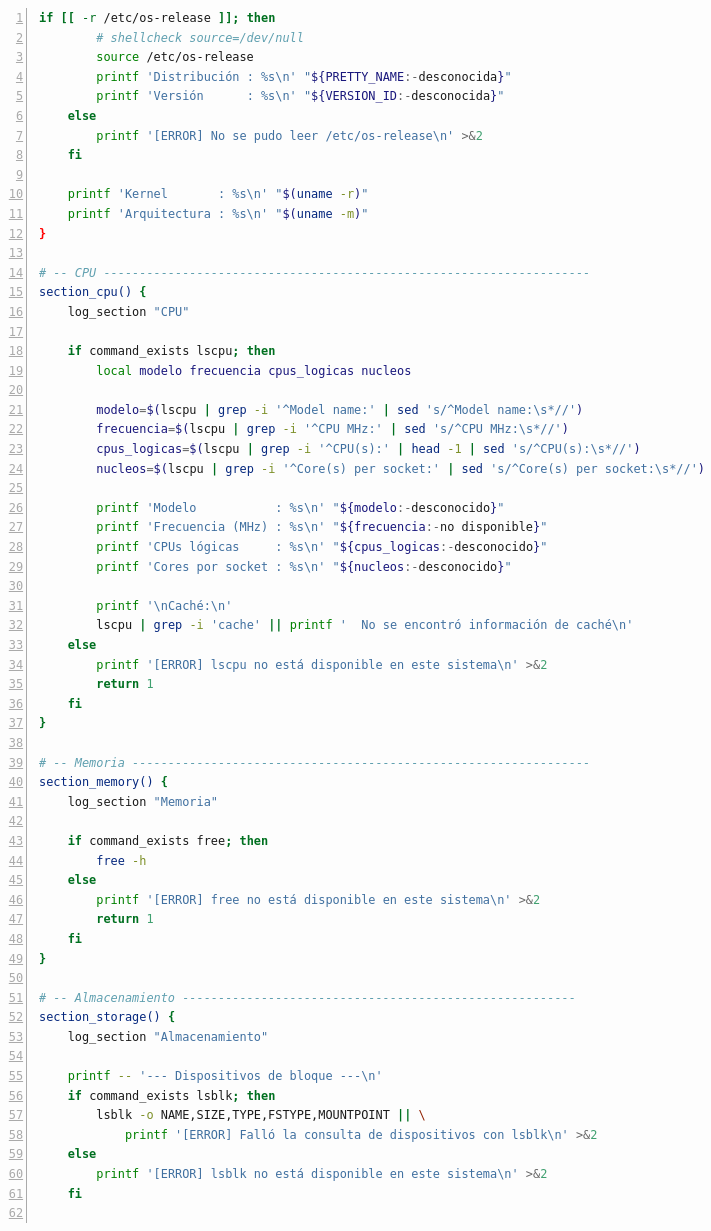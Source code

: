 \documentclass[11pt,a4paper]{article}
\begin{document}
\begin{multicols*}{2}
\begin{lstlisting}[language=bash, basicstyle=\fontsize{5.2pt}{6.0pt}\ttfamily\color{darkslate}, numbers=left, numberstyle=\tiny\color{gray!70}, stepnumber=10, xleftmargin=1.0em]
    if [[ -r /etc/os-release ]]; then
        # shellcheck source=/dev/null
        source /etc/os-release
        printf 'Distribución : %s\n' "${PRETTY_NAME:-desconocida}"
        printf 'Versión      : %s\n' "${VERSION_ID:-desconocida}"
    else
        printf '[ERROR] No se pudo leer /etc/os-release\n' >&2
    fi

    printf 'Kernel       : %s\n' "$(uname -r)"
    printf 'Arquitectura : %s\n' "$(uname -m)"
}

# -- CPU --------------------------------------------------------------------
section_cpu() {
    log_section "CPU"

    if command_exists lscpu; then
        local modelo frecuencia cpus_logicas nucleos

        modelo=$(lscpu | grep -i '^Model name:' | sed 's/^Model name:\s*//')
        frecuencia=$(lscpu | grep -i '^CPU MHz:' | sed 's/^CPU MHz:\s*//')
        cpus_logicas=$(lscpu | grep -i '^CPU(s):' | head -1 | sed 's/^CPU(s):\s*//')
        nucleos=$(lscpu | grep -i '^Core(s) per socket:' | sed 's/^Core(s) per socket:\s*//')

        printf 'Modelo           : %s\n' "${modelo:-desconocido}"
        printf 'Frecuencia (MHz) : %s\n' "${frecuencia:-no disponible}"
        printf 'CPUs lógicas     : %s\n' "${cpus_logicas:-desconocido}"
        printf 'Cores por socket : %s\n' "${nucleos:-desconocido}"

        printf '\nCaché:\n'
        lscpu | grep -i 'cache' || printf '  No se encontró información de caché\n'
    else
        printf '[ERROR] lscpu no está disponible en este sistema\n' >&2
        return 1
    fi
}

# -- Memoria ----------------------------------------------------------------
section_memory() {
    log_section "Memoria"

    if command_exists free; then
        free -h
    else
        printf '[ERROR] free no está disponible en este sistema\n' >&2
        return 1
    fi
}

# -- Almacenamiento -------------------------------------------------------
section_storage() {
    log_section "Almacenamiento"

    printf -- '--- Dispositivos de bloque ---\n'
    if command_exists lsblk; then
        lsblk -o NAME,SIZE,TYPE,FSTYPE,MOUNTPOINT || \
            printf '[ERROR] Falló la consulta de dispositivos con lsblk\n' >&2
    else
        printf '[ERROR] lsblk no está disponible en este sistema\n' >&2
    fi


\end{lstlisting}
\end{multicols*}
\end{document}
